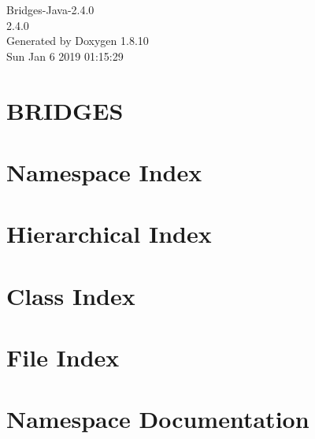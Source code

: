 \documentclass[twoside]{book}
\newcommand{\+}{\discretionary{\mbox{\scriptsize$\hookleftarrow$}}{}{}}
\newcommand{\clearemptydoublepage}{%
  \newpage{\pagestyle{empty}\cleardoublepage}%
}
\begin{document}
\hypersetup{pageanchor=false,
             bookmarks=true,
             bookmarksnumbered=true,
             pdfencoding=unicode
            }
\begin{titlepage}
\vspace*{7cm}
\begin{center}%
{\Large Bridges-\/\+Java-\/2.4.0 \\[1ex]\large 2.\+4.\+0 }\\
\vspace*{1cm}
{\large Generated by Doxygen 1.8.10}\\
\vspace*{0.5cm}
{\small Sun Jan 6 2019 01:15:29}\\
\end{center}
\end{titlepage}
\clearemptydoublepage
\tableofcontents
\clearemptydoublepage
{}
\hypersetup{pageanchor=true}

\chapter{B\+R\+I\+D\+G\+E\+S}
\label{index}\hypertarget{index}{}
\chapter{Namespace Index}

\chapter{Hierarchical Index}

\chapter{Class Index}

\chapter{File Index}

\chapter{Namespace Documentation}





\end{document}
